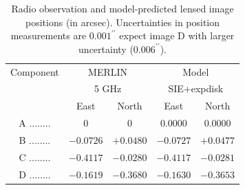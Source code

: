 \documentclass[useAMS,usenatbib]{mnras}
\begin{document}

\begin{table}
\centering
  \caption{Radio observation \citep{Marlow99} and model-predicted lensed image positions (in arcsec). Uncertainties in position measurements are $0.001^ {\prime \prime}$ expect image D with larger uncertainty ($0.006^ {\prime \prime}$).}
  \begin{tabular}{@{}ccccc}
\hline

Component	&\multicolumn{2}{c}{MERLIN} 	 & \multicolumn{2}{c}{Model} \\
					&\multicolumn{2}{c}{5 GHz}		&	\multicolumn{2}{c}{SIE+expdisk} 	\\
					 &East &North &East 		&North \\ 
\hline
A ........ &$0$    		&$0$		&$0.0000$ &$0.0000$   \\  
B ........ &$-0.0726$ 	&$+0.0480 $	&$-0.0727$ &$+0.0477$  \\  
C ........ &$-0.4117$  &$-0.0280$	&$-0.4117$ &$-0.0281$   \\  
D ........ &$-0.1619$  &$-0.3680$	&$-0.1630$ &$-0.3653$  \\  
\hline
\end{tabular}

\end{table}
\end{document}

